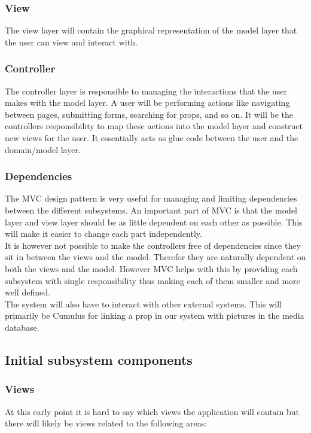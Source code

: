 \documentclass[12pt]{article}
\begin{document}
\subsubsection{View}
The view layer will contain the graphical representation of the model layer that
the user can view and interact with.
\subsubsection{Controller}
The controller layer is responsible to managing the interactions that the user
makes with the model layer. A user will be performing actions like navigating
between pages, submitting forms, searching for props, and so on. It will be the
controllers responsibility to map these actions into the model layer and
construct new views for the user. It essentially acts as glue code between the
user and the domain/model layer.

\subsubsection{Dependencies}
The MVC design pattern is very useful for managing and limiting dependencies
between the different subsystems. An important part of MVC is that the model
layer and view layer should be as little dependent on each other as possible.
This will make it easier to change each part independently.\\
It is however not possible to make the controllers free of dependencies since
they sit in between the views and the model. Therefor they are naturally
dependent on both the views and the model. However MVC helps with this by
providing each subsystem with single responsibility thus making each of them
smaller and more well defined.\\
The system will also have to interact with other external systems. This will
primarily be Cumulus for linking a prop in our system with pictures in the media
database.
\subsection{Initial subsystem components}
\subsubsection{Views}
At this early point it is hard to say which views the application will contain
but there will likely be views related to the following areas:
\end{document}
